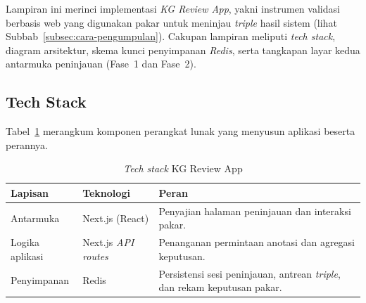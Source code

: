 \documentclass[../../thesis]{subfiles}
\begin{document}
\ifSubfilesClassLoaded{}{\appendix\setcounter{chapter}{1}}

\label{lamp:kg-review-app}

Lampiran ini merinci implementasi \textit{KG Review App}, yakni instrumen
validasi berbasis web yang digunakan pakar untuk meninjau \textit{triple}
hasil sistem (lihat Subbab~\ref{subsec:cara-pengumpulan}). Cakupan lampiran
meliputi \textit{tech stack}, diagram arsitektur, skema kunci penyimpanan
\textit{Redis}, serta tangkapan layar kedua antarmuka peninjauan (Fase~1 dan
Fase~2).

\subsection{Tech Stack}
\label{lamp:tech-stack}

Tabel~\ref{tab:tech-stack} merangkum komponen perangkat lunak yang
menyusun aplikasi beserta perannya.

\begin{table}[htbp]
  \centering
  \caption{\textit{Tech stack} KG Review App}
  \label{tab:tech-stack}
  \begin{tabularx}{\linewidth}{@{}l l X@{}}
    \toprule
    \textbf{Lapisan} & \textbf{Teknologi} & \textbf{Peran} \\
    \midrule
    Antarmuka      & Next.js (React) & Penyajian halaman peninjauan dan
                     interaksi pakar. \\
    Logika aplikasi & Next.js \textit{API routes} & Penanganan permintaan
                     anotasi dan agregasi keputusan. \\
    Penyimpanan    & Redis & Persistensi sesi peninjauan, antrean
                     \textit{triple}, dan rekam keputusan pakar. \\
    \bottomrule
  \end{tabularx}
\end{table}

\end{document}
